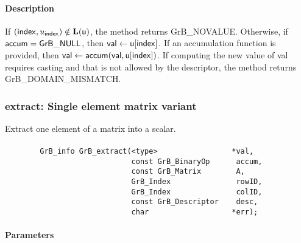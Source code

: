 \paragraph{Description}

If $({\sf index},u_{\sf index}) \notin \bold{L}({\sf u})$, the method returns {\sf GrB\_NOVALUE}.
Otherwise, if ${\sf accum} = {\sf GrB\_NULL}$, then ${\sf val} \leftarrow {\sf u}[{\sf index}]$.
If an accumulation function is provided, then ${\sf val} \leftarrow {\sf accum}({\sf val},{\sf u}[{\sf index}])$.
If computing the new value of {\sf val} requires casting and that is not allowed by the descriptor,
the method returns {\sf GrB\_DOMAIN\_MISMATCH}.


\subsubsection{{\sf extract}: Single element matrix variant}
\label{Sec:extract_single_element_mat}


Extract one element of a matrix into a scalar. 

\paragraph{\syntax}

\begin{verbatim}
        GrB_info GrB_extract(<type>                 *val,
                             const GrB_BinaryOp      accum,
                             const GrB_Matrix        A,
                             GrB_Index               rowID,
                             GrB_Index               colID,
                             const GrB_Descriptor    desc,
                             char                   *err); 

\end{verbatim}

\paragraph{Parameters}

